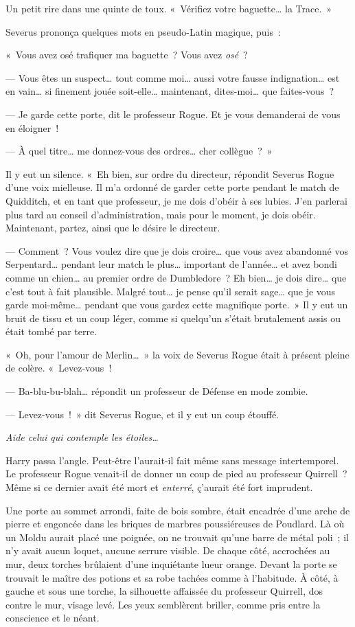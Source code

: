 Un petit rire dans une quinte de toux.
«~Vérifiez votre baguette… la Trace.~»

Severus prononça quelques mots en pseudo-Latin magique, puis~:

«~Vous avez osé trafiquer ma baguette~?
Vous avez \emph{osé}~?

--- Vous êtes un suspect… tout comme moi… aussi votre fausse indignation… est en vain… si finement jouée soit-elle… maintenant, dites-moi… que faites-vous~?

--- Je garde cette porte, dit le professeur Rogue.
Et je vous demanderai de vous en éloigner~!

--- À quel titre… me donnez-vous des ordres… cher collègue~?~»

Il y eut un silence.
«~Eh bien, sur ordre du directeur, répondit Severus Rogue d'une voix mielleuse.
Il m'a ordonné de garder cette porte pendant le match de Quidditch, et en tant que professeur, je me dois d'obéir à ses lubies.
J'en parlerai plus tard au conseil d'administration, mais pour le moment, je dois obéir.
Maintenant, partez, ainsi que le désire le directeur.

--- Comment~?
Vous voulez dire que je dois croire… que vous avez abandonné vos Serpentard… pendant leur match le plus… important de l'année… et avez bondi comme un chien… au premier ordre de Dumbledore~?
Eh bien… je dois dire… que c'est tout à fait plausible.
Malgré tout… je pense qu'il serait sage… que je vous garde moi-même… pendant que vous gardez cette magnifique porte.~»
Il y eut un bruit de tissu et un coup léger, comme si quelqu'un s'était brutalement assis ou était tombé par terre.

«~Oh, pour l'amour de Merlin…~»
la voix de Severus Rogue était à présent pleine de colère.
«~Levez-vous~!

--- Ba-blu-bu-blah… répondit un professeur de Défense en mode zombie.

--- Levez-vous~!~»
dit Severus Rogue, et il y eut un coup étouffé.

\emph{Aide celui qui contemple les étoiles…}

Harry passa l'angle.
Peut-être l'aurait-il fait même sans message intertemporel.
Le professeur Rogue venait-il de donner un coup de pied au professeur Quirrell~?
Même si ce dernier avait été mort et \emph{enterré}, ç'aurait été fort imprudent.

Une porte au sommet arrondi, faite de bois sombre, était encadrée d'une arche de pierre et engoncée dans les briques de marbres poussiéreuses de Poudlard.
Là où un Moldu aurait placé une poignée, on ne trouvait qu'une barre de métal poli~; il n'y avait aucun loquet, aucune serrure visible.
De chaque côté, accrochées au mur, deux torches brûlaient d'une inquiétante lueur orange.
Devant la porte se trouvait le maître des potions et sa robe tachées comme à l'habitude.
À côté, à gauche et sous une torche, la silhouette affaissée du professeur Quirrell, dos contre le mur, visage levé.
Les yeux semblèrent briller, comme pris entre la conscience et le néant.

